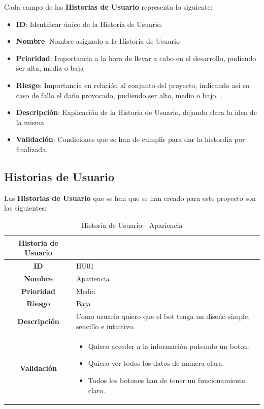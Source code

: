 Cada campo de las \textbf{Historias de Usuario} representa lo siguiente:

\begin{itemize}
	\item \textbf{ID}: Identificar único de la Historia de Usuario.
	\item \textbf{Nombre}: Nombre asignado a la Historia de Usuario
	\item \textbf{Prioridad}: Importancia a la hora de llevar a cabo en el desarrollo, pudiendo ser alta, media o baja
	\item \textbf{Riesgo}: Importancia en relación al conjunto del proyecto, indicando así en caso de fallo el daño provocado, pudiendo ser alto, medio o bajo. .
	\item \textbf{Descripción}: Explicación de la Historia de Usuario, dejando clara la idea de la misma
	\item \textbf{Validación}: Condiciones que se han de cumplir para dar la histordia por finalizada.
\end{itemize}

\subsection{Historias de Usuario}

Las \textbf{Historias de Usuario} que se han que se han creado para este proyecto son las siguientes:

\begin{table}[H]
	\begin{center}
		\begin{tabular}{| c | p{9cm} |}
			\hline
			
			Historia de Usuario &  \\ \hline
			
			
			\textbf{ID} & HU01 \\
			\textbf{Nombre} & Apariencia \\
			\textbf{Prioridad} & Media \\
			\textbf{Riesgo} & Baja \\
			\textbf{Descripción} & Como usuario quiero que el bot tenga un diseño simple, sencillo e intuitivo. \\
			\textbf{Validación} & \begin{itemize}
				\item Quiero acceder a la información pulsando un boton.
				\item Quiero ver todos los datos de manera clara.
				\item Todos los botones han de tener un funcionamiento claro.
			\end{itemize} \\ \hline
		\end{tabular}
		\caption{Historia de Usuario - Apariencia}
	\end{center}
\end{table}

